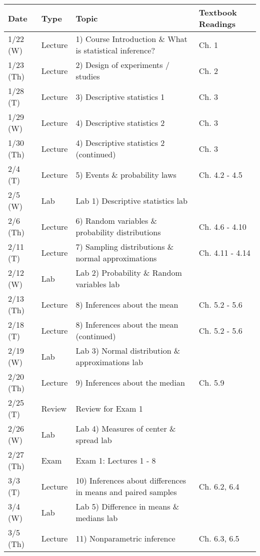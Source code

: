 \documentclass{article}
\begin{document}
\begin{center}
	\begin{tabular}{|p{2cm}|p{1.5cm}|p{9cm}|p{2.9cm}|}
		\hline
		Date & Type & Topic & Textbook Readings \\ \hline \hline
		1/22 (W) & Lecture & 1) Course Introduction \& What is statistical inference? & Ch. 1 \\ \hline
		1/23 (Th) & Lecture & 2) Design of experiments / studies & Ch. 2 \\ \hline
		1/28 (T) & Lecture & 3) Descriptive statistics 1 & Ch. 3 \\ \hline
		1/29 (W) & Lecture & 4) Descriptive statistics 2 & Ch. 3 \\ \hline
		1/30 (Th) & Lecture & 4) Descriptive statistics 2 (continued) & Ch. 3 \\ \hline
		2/4 (T) & Lecture & 5) Events \& probability laws & Ch. 4.2 - 4.5 \\ \hline	
		2/5 (W) & Lab & Lab 1) Descriptive statistics lab & \\ \hline
		2/6 (Th) & Lecture & 6) Random variables \& probability distributions & Ch. 4.6 - 4.10 \\ \hline
		2/11 (T) & Lecture &  7) Sampling distributions \& normal approximations & Ch. 4.11 - 4.14 \\ \hline
		2/12 (W) & Lab & Lab 2) Probability \& Random variables lab & \\ \hline
		2/13 (Th) & Lecture & 8) Inferences about the mean & Ch. 5.2 - 5.6 \\ \hline
		2/18 (T) & Lecture & 8) Inferences about the mean (continued) & Ch. 5.2 - 5.6 \\ \hline
		2/19 (W) & Lab & Lab 3) Normal distribution \& approximations lab & \\ \hline
		2/20 (Th) & Lecture & 9) Inferences about the median & Ch. 5.9 \\ \hline
		2/25 (T) & Review & Review for Exam 1 & \\ \hline
		2/26 (W) & Lab & Lab 4) Measures of center \& spread lab & \\ \hline
		2/27 (Th) & Exam & Exam 1: Lectures 1 - 8 & \\ \hline
		3/3 (T) & Lecture & 10) Inferences about differences in means and paired samples & Ch. 6.2, 6.4 \\ \hline
		3/4 (W) & Lab & Lab 5) Difference in means \& medians lab & \\ \hline 
		3/5 (Th) & Lecture &  11) Nonparametric inference & Ch. 6.3, 6.5 \\ \hline

\end{tabular}
\end{center}
\end{document}
